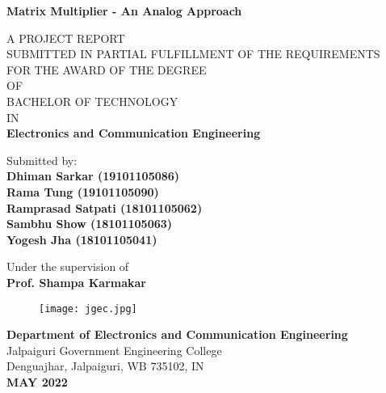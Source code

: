 \begin{center}
	
\textbf{\Large Matrix Multiplier - An Analog Approach\\}

\vspace{.8cm}

{A PROJECT REPORT\\SUBMITTED IN PARTIAL FULFILLMENT OF THE REQUIREMENTS\\FOR THE AWARD OF THE DEGREE\\OF\\BACHELOR OF TECHNOLOGY\\IN\\}
\textbf{Electronics and Communication Engineering}

\vspace{3cm}

{Submitted by:\\}
\textbf{Dhiman Sarkar (19101105086)\\}
\textbf{Rama Tung (19101105090)\\}
\textbf{Ramprasad Satpati (18101105062)\\}
\textbf{Sambhu Show (18101105063)\\}
\textbf{Yogesh Jha (18101105041)\\}

\vspace{1.3cm}

Under the supervision of\\
\textbf{Prof. Shampa Karmakar}

\vspace{3cm}

\begin{figure}[h]
	\centering
	\texttt{[image: jgec.jpg]}
\end{figure}
\textbf{\large Department of Electronics and Communication Engineering\\}
{\large Jalpaiguri Government Engineering College\\}
{Denguajhar, Jalpaiguri, WB 735102, IN\\}
\textbf{MAY 2022\\}
\end{center}